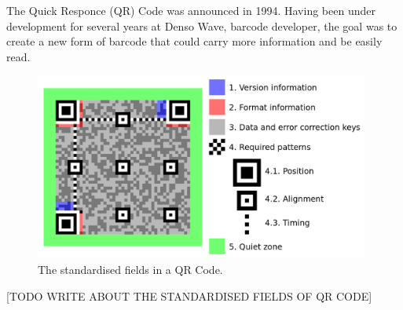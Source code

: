 The Quick Responce (QR) Code was announced in 1994. Having been under development for several years at Denso Wave, barcode developer, the goal was to create a new form of barcode that could carry more information and be easily read.\cite{qrCodeHistory}

	\begin{figure}[ht!]
		\centering
		\includegraphics[width=110mm]{images/qrcodestandard}
		\caption{The standardised fields in a QR Code.\cite{qrCodeWiki}}
		\label{qrcodestandard}
	\end{figure}
	
[TODO WRITE ABOUT THE STANDARDISED FIELDS OF QR CODE]